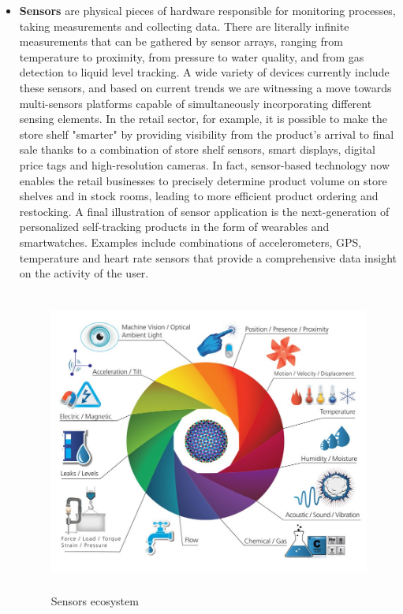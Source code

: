\begin{itemize}
  \item \textbf{Sensors} are physical pieces of hardware responsible for monitoring processes, taking measurements and collecting data. There are literally infinite measurements that can be gathered by sensor arrays, ranging from temperature to proximity, from pressure to water quality, and from gas detection to liquid level tracking. A wide variety of devices currently include these sensors, and based on current trends we are witnessing a move towards multi-sensors platforms capable of simultaneously incorporating different sensing elements. In the retail sector, for example, it is possible to make the store shelf "smarter" by providing visibility from the product's arrival to final sale thanks to a combination of store shelf sensors, smart displays, digital price tags and high-resolution cameras. In fact, sensor-based technology now enables the retail businesses to precisely determine product volume on store shelves and in stock rooms, leading to more efficient product ordering and restocking. A final illustration of sensor application is the next-generation of personalized self-tracking products in the form of wearables and smartwatches. Examples include combinations of accelerometers, GPS, temperature and heart rate sensors that provide a comprehensive data insight on the activity of the user.   
  

  \vspace{0.5cm}
  \begin{figure}[htbp]
    \centering
      \includegraphics[height=10cm]{images/iot-sensors.jpg}
    \caption{Sensors ecosystem}
    \label{fig:sensors}
  \end{figure}
  \vspace{0.5cm}

\end{itemize} 


